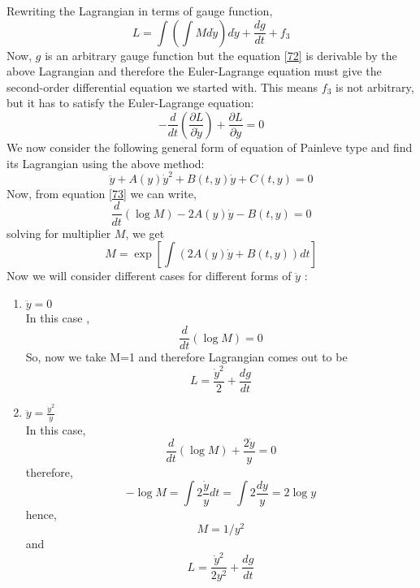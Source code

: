 \documentclass[12pt]{article}
\begin{document}
Rewriting the Lagrangian in terms of gauge function,
\begin{equation} 
L=\int\left(\int M d \dot{y}\right) d \dot{y}+\frac{d g}{d t}+f_{3} \label{130}
\end{equation}
Now, $g$ is an arbitrary gauge function but the equation \eqref{72} is derivable by the above Lagrangian and therefore the Euler-Lagrange equation must give the second-order differential equation we started with. This means $f_{3}$ is not arbitrary, but it has to satisfy the Euler-Lagrange equation:
\begin{equation}
-\frac{d}{d t}\left(\frac{\partial L}{\partial \dot{y}}\right)+\frac{\partial L}{\partial y}=0 \label{131}
\end{equation}
We now consider the following general form of equation of {Painleve type} \cite{encyclopedia_of_math_painleve_equations} and  find its Lagrangian using the above method:
\begin{equation}
\ddot{y}+A(y) \dot{y}^{2}+B(t, y) \dot{y}+C(t, y)=0 \label{132}
\end{equation}
Now, from equation \eqref{73} we can write,
\begin{equation}
\frac{d}{d t}(\log M)-2 A(y) \dot{y}-B(t, y)=0 \label{133}
\end{equation}
solving for multiplier $M$, we get
\begin{equation}
M=\exp \left[\int(2 A(y) \dot{y}+B(t, y)) d t\right] \label{134}
\end{equation}   
Now we will consider different cases for different forms of $\ddot{y}$ :
\begin{enumerate}
    \item $\ddot{y}=0$ \\
    In this case ,
\begin{equation}
\frac{d}{d t}(\log M)=0 \label{135}
\end{equation}
So, now we take M=1 and therefore Lagrangian comes out to be
\begin{equation}
L=\frac{\dot{y}^{2}}{2}+\frac{d g}{d t} \label{136}
\end{equation}
     \item $\ddot{y}=\frac{\dot{y}^{2}}{y}$\\
     In this case,
\begin{equation}
\frac{d}{d t}(\log M)+\frac{2 \dot{y}}{y}=0
\end{equation}
therefore, 
\begin{equation}
-\log M=\int 2 \frac{\dot{y}}{y} d t=\int 2 \frac{d y}{y}=2 \log y
\end{equation}
hence,
\begin{equation}
M=1 / y^{2}
\end{equation}
and
\begin{equation}
L=\frac{\dot{y}^{2}}{2 y^{2}}+\frac{d g}{d t}
\end{equation}
\end{enumerate}
\end{document}
